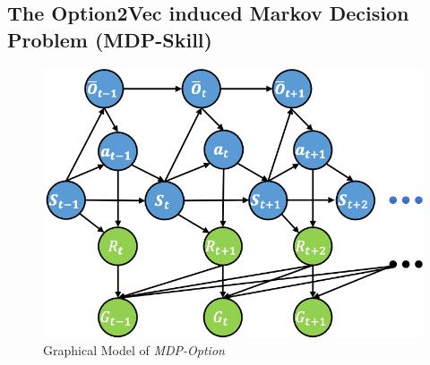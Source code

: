 \documentclass{article}
\begin{document}
\subsection{The Option2Vec induced Markov Decision Problem
  (MDP-Skill)}
\label{sec:sa_PGM}

\begin{figure}
  \vspace{-4mm}
  \includegraphics[width=1\linewidth]{./figures/doe.png}
  \caption{\label{fig:pgm_mdp_skill} Graphical Model of
    \emph{MDP-Option}}
  \vspace{-5mm}
\end{figure}

   
\end{document}
